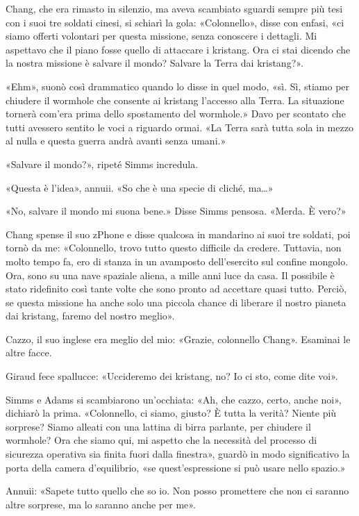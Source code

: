 Chang, che era rimasto in silenzio, ma aveva scambiato sguardi sempre
più tesi con i suoi tre soldati cinesi, si schiarì la gola:
«Colonnello», disse con enfasi, «ci siamo offerti volontari per questa
missione, senza conoscere i dettagli. Mi aspettavo che il piano fosse
quello di attaccare i kristang. Ora ci stai dicendo che la nostra
missione è salvare il mondo? Salvare la Terra dai kristang?».

«Ehm», suonò così drammatico quando lo disse in quel modo, «sì. Sì,
stiamo per chiudere il wormhole che consente ai kristang l'accesso alla
Terra. La situazione tornerà com'era prima dello spostamento del
wormhole.» Davo per scontato che tutti avessero sentito le voci a
riguardo ormai. «La Terra sarà tutta sola in mezzo al nulla e questa
guerra andrà avanti senza umani.»

«Salvare il mondo?», ripeté Simms incredula.

«Questa è l'idea», annuii. «So che è una specie di cliché, ma\ldots»

«No, salvare il mondo mi suona bene.» Disse Simms pensosa. «Merda. È
vero?»

Chang spense il suo zPhone e disse qualcosa in mandarino ai suoi tre
soldati, poi tornò da me: «Colonnello, trovo tutto questo difficile da
credere. Tuttavia, non molto tempo fa, ero di stanza in un avamposto
dell'esercito sul confine mongolo. Ora, sono su una nave spaziale
aliena, a mille anni luce da casa. Il possibile è stato ridefinito così
tante volte che sono pronto ad accettare quasi tutto. Perciò, se questa
missione ha anche solo una piccola chance di liberare il nostro pianeta
dai kristang, faremo del nostro meglio».

Cazzo, il suo inglese era meglio del mio: «Grazie, colonnello Chang».
Esaminai le altre facce.

Giraud fece spallucce: «Uccideremo dei kristang, no? Io ci sto, come
dite voi».

Simms e Adams si scambiarono un'occhiata: «Ah, che cazzo, certo, anche
noi», dichiarò la prima. «Colonnello, ci siamo, giusto? È tutta la
verità? Niente più sorprese? Siamo alleati con una lattina di birra
parlante, per chiudere il wormhole? Ora che siamo qui, mi aspetto che la
necessità del processo di sicurezza operativa sia finita fuori dalla
finestra», guardò in modo significativo la porta della camera
d'equilibrio, «se quest'espressione si può usare nello spazio.»

Annuii: «Sapete tutto quello che so io. Non posso promettere che non ci
saranno altre sorprese, ma lo saranno anche per me».


